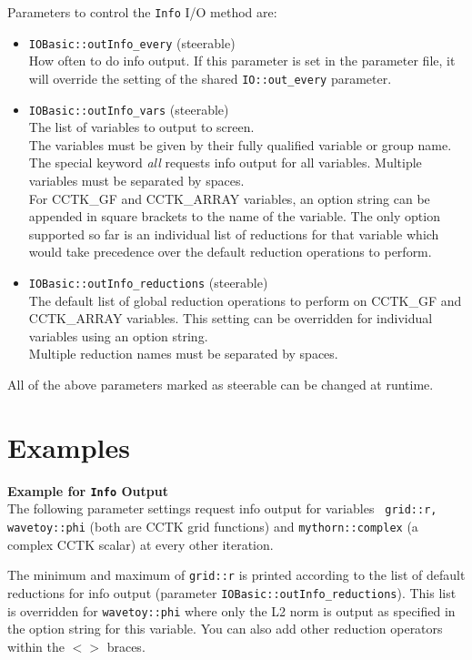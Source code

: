 \documentclass{article}
\begin{document}
%
%
Parameters to control the {\tt Info} I/O method are:
\begin{itemize}
  \item {\tt IOBasic::outInfo\_every} (steerable)\\
        How often to do info output. If this parameter is set in the
        parameter file, it will override the setting of the shared
        {\tt IO::out\_every} parameter.
  \item {\tt IOBasic::outInfo\_vars} (steerable)\\
        The list of variables to output to screen.\\
        The variables must be given by their fully qualified variable or group
        name. The special keyword {\it all} requests info output for all
        variables. Multiple variables must be separated by spaces.\\
        For CCTK\_GF and CCTK\_ARRAY variables, an option string can be appended
        in square brackets to the name of the variable. The only option
        supported so far is an individual list of reductions for that variable
        which would take precedence over the default reduction operations to
        perform.
  \item {\tt IOBasic::outInfo\_reductions} (steerable)\\
        The default list of global reduction operations to perform on
        CCTK\_GF and CCTK\_ARRAY variables. This setting can be overridden
        for individual variables using an option string.\\
        Multiple reduction names must be separated by spaces.
\end{itemize}
All of the above parameters marked as steerable can be changed at runtime.
%
%
\section{Examples}
%
{\bf Example for {\tt Info} Output}\\
%
The following parameter settings request info output for variables {\tt
grid::r, wavetoy::phi} (both are CCTK grid functions) and {\tt mythorn::complex}
(a complex CCTK scalar) at every other iteration.

The minimum and maximum of {\tt grid::r} is printed according to the list
of default reductions for info output (parameter {\tt IOBasic::outInfo\_reductions}). This list is overridden for {\tt wavetoy::phi} where only the L2 norm
is output as specified in the option string for this variable. You can also
add other reduction operators within the $<>$ braces.
\end{document}
